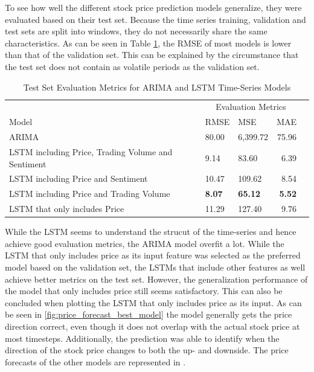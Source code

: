 \documentclass[11pt, a4paper]{article}
\begin{document}
To see how well the different stock price prediction models generalize, they were evaluated based on their test set.
Because the time series training, validation and test sets are split into windows, they do not necessarily share the same
characteristics. As can be seen in Table \ref{tab:results_stocks}, the RMSE of most models is lower than that of the
validation set. This can be explained by the circumstance that the test set does not contain as volatile periods as the
validation set.

\begin{table}[!h]
    \caption{Test Set Evaluation Metrics for ARIMA and LSTM Time-Series Models}
    \label{tab:results_stocks}
    \centering
    \small

    \begin{tabular}{lllrr}
        \toprule
                                        & \multicolumn{3}{c}{Evaluation Metrics} \\
                                        \cmidrule{2-4}
                            Model       & RMSE      & MSE     & MAE    \\
            \midrule
            \multirow{1}{*}{ARIMA}         & 80.00          & 6,399.72          & 75.96 \\
            \midrule
            \multirow{1}{*}{LSTM including Price, Trading Volume and Sentiment}       & 9.14          & 83.60          & 6.39 \\
            \midrule
            \multirow{1}{*}{LSTM including Price and Sentiment}       & 10.47          & 109.62          & 8.54 \\
            \midrule
            \multirow{1}{*}{LSTM including Price and Trading Volume}      & \textbf{8.07}           & \textbf{65.12}          & \textbf{5.52} \\
            \midrule
            \multirow{1}{*}{LSTM that only includes Price}      & 11.29         & 127.40          & 9.76 \\

        \bottomrule
    \end{tabular}

\end{table}

While the LSTM seems to understand the strucut of the time-series and hence achieve good evaluation metrics, the ARIMA model
overfit a lot. While the LSTM that only includes price as its input feature was selected as the preferred model based on the
validation set, the LSTMs that include other features as well achieve better metrics on the test set. However, the generalization
performance of the model that only includes price still seems satisfactory.
This can also be concluded when plotting the LSTM that only includes price as its input.
As can be seen in \ref{fig:price_forecast_best_model} the model generally gets the price direction correct, even though it does not
overlap with the actual stock price at most timesteps.
Additionally, the prediction was able to identify when the direction of the stock price changes to both the up- and downside.
The price forecasts of the other models are represented in .
\end{document}
